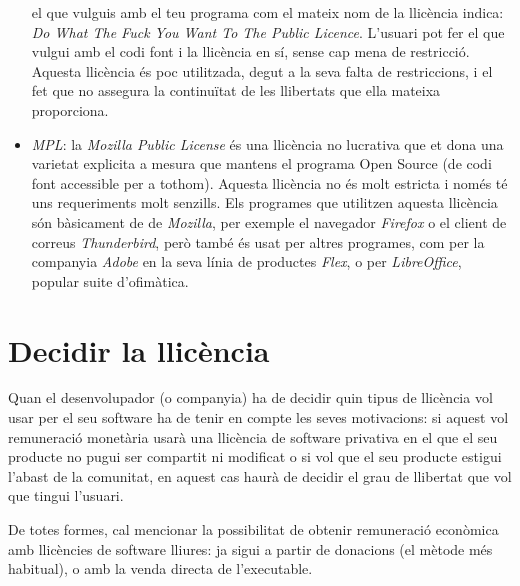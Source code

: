\begin{itemize}
	el que vulguis amb el teu programa com el mateix nom de la llicència indica:
	\emph{Do What The Fuck You Want To The Public Licence}.
	L'usuari pot fer el que vulgui amb el codi font i la llicència en sí, sense
	cap mena de restricció. Aquesta llicència és poc utilitzada, degut a la seva
	falta de restriccions, i el fet que no assegura la continuïtat de les llibertats
	que ella mateixa proporciona.\cite {tldr}
	\item \emph{MPL}: la \emph{Mozilla Public License} és una llicència no lucrativa 
	que et dona una varietat explicita a mesura que mantens el programa Open Source
	(de codi font accessible per a tothom). Aquesta llicència no és molt estricta
	i només té uns requeriments molt senzills.
	Els programes que utilitzen aquesta llicència són bàsicament de de \emph{Mozilla},
	per exemple el navegador \emph{Firefox} o el client de correus \emph{Thunderbird},
	però també és usat per altres programes, com per la companyia \emph{Adobe} en
	la seva línia de productes \emph{Flex}, o per \emph{LibreOffice}, popular suite
	d'ofimàtica. \cite {tldr}
\end{itemize}

\section{Decidir la llicència}
Quan el desenvolupador (o companyia) ha de decidir quin tipus de llicència vol
usar per el seu software ha de tenir en compte les seves motivacions: si aquest
vol remuneració monetària usarà una llicència de software privativa en el que el 
seu producte no pugui ser compartit ni modificat o si vol que el seu producte estigui l'abast de 
la comunitat, en aquest cas haurà de decidir el grau de llibertat que vol que tingui 
l'usuari.

De totes formes, cal mencionar la possibilitat de obtenir remuneració econòmica amb llicències
de software lliures: ja sigui a partir de donacions (el mètode més habitual), o amb la
venda directa de l'executable.

